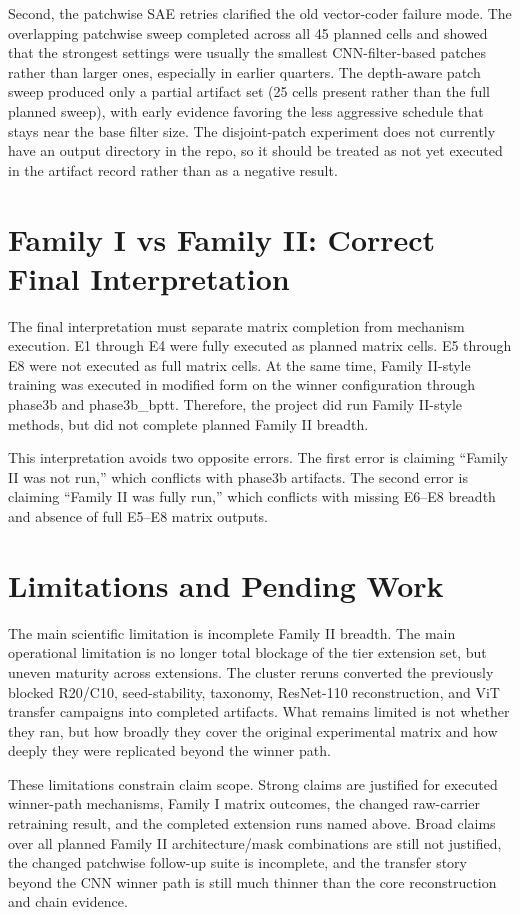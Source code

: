 \documentclass[11pt]{article}
\begin{document}
Second, the patchwise SAE retries clarified the old vector-coder failure mode. The overlapping patchwise sweep completed across all 45 planned cells and showed that the strongest settings were usually the smallest CNN-filter-based patches rather than larger ones, especially in earlier quarters. The depth-aware patch sweep produced only a partial artifact set (25 cells present rather than the full planned sweep), with early evidence favoring the less aggressive schedule that stays near the base filter size. The disjoint-patch experiment does not currently have an output directory in the repo, so it should be treated as not yet executed in the artifact record rather than as a negative result.

\section{Family I vs Family II: Correct Final Interpretation}
The final interpretation must separate matrix completion from mechanism execution. E1 through E4 were fully executed as planned matrix cells. E5 through E8 were not executed as full matrix cells. At the same time, Family II-style training was executed in modified form on the winner configuration through phase3b and phase3b\_bptt. Therefore, the project did run Family II-style methods, but did not complete planned Family II breadth.

This interpretation avoids two opposite errors. The first error is claiming ``Family II was not run,'' which conflicts with phase3b artifacts. The second error is claiming ``Family II was fully run,'' which conflicts with missing E6--E8 breadth and absence of full E5--E8 matrix outputs.

\section{Limitations and Pending Work}
The main scientific limitation is incomplete Family II breadth. The main operational limitation is no longer total blockage of the tier extension set, but uneven maturity across extensions. The cluster reruns converted the previously blocked R20/C10, seed-stability, taxonomy, ResNet-110 reconstruction, and ViT transfer campaigns into completed artifacts. What remains limited is not whether they ran, but how broadly they cover the original experimental matrix and how deeply they were replicated beyond the winner path.

These limitations constrain claim scope. Strong claims are justified for executed winner-path mechanisms, Family I matrix outcomes, the changed raw-carrier retraining result, and the completed extension runs named above. Broad claims over all planned Family II architecture/mask combinations are still not justified, the changed patchwise follow-up suite is incomplete, and the transfer story beyond the CNN winner path is still much thinner than the core reconstruction and chain evidence.
\end{document}
